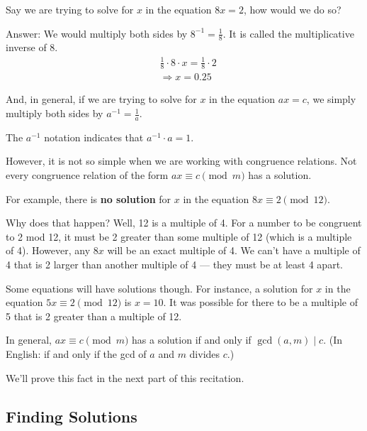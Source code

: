 \documentclass[12pt,letterpaper]{article}
\begin{document}
	Say we are trying to solve for $x$ in the equation $8x = 2$, how would we do so?

	Answer: We would multiply both sides by $8^{-1} = \frac{1}{8}$. It is called the multiplicative inverse of 8.
	\begin{align*}
		&\frac{1}{8}\cdot 8 \cdot x  = \frac{1}{8} \cdot 2 \\
		&\Rightarrow x = 0.25
	\end{align*}	

	And, in general, if we are trying to solve for $x$ in the equation $ax = c$, we simply multiply both sides by $a^{-1} = \frac{1}{a}$. 

	The $a^{-1}$ notation indicates that $a^{-1}\cdot a = 1$. 

	However, it is not so simple when we are working with congruence relations. Not every congruence relation of the form $ax \equiv c \pmod{m}$ has a solution.

	For example, there is \textbf{no solution} for $x$ in the equation $8x \equiv 2 \pmod{12}$.
	
	Why does that happen? Well, 12 is a multiple of 4. For a number to be congruent to 2 mod 12, it must be 2 greater than some multiple of 12 (which is a multiple of 4). However, any $8x$ will be an exact multiple of 4. We can't have a multiple of 4 that is 2 larger than another multiple of 4 — they must be at least 4 apart.
	
	Some equations will have solutions though. For instance, a solution for $x$ in the equation $5x \equiv 2 \pmod{12}$ is $x=10$. It was possible for there to be a multiple of 5 that is 2 greater than a multiple of 12.
	
	In general, $ax \equiv c \pmod{m}$ has a solution if and only if $\gcd(a,m) \mid c$. (In English: if and only if the gcd of $a$ and $m$ divides $c$.)
	
	We'll prove this fact in the next part of this recitation.
    
    \pagebreak

	\subsection*{Finding Solutions}
\end{document}

